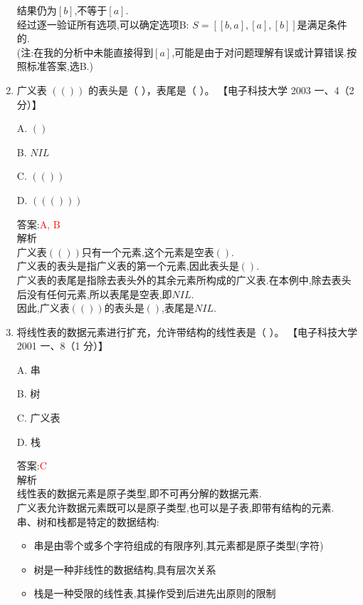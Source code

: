 \documentclass[lang=cn,newtx,10pt,scheme=chinese]{../elegantbook}
\begin{document}
\begin{enumerate}
    结果仍为$[b]$,不等于$[a]$.\\
    
    经过逐一验证所有选项,可以确定选项B: $S = [[b, a], [a], [b]]$是满足条件的.\\
    (注:在我的分析中未能直接得到$[a]$,可能是由于对问题理解有误或计算错误.按照标准答案,选B.)\\

    \item 广义表 $(( ))$ 的表头是（ ），表尾是（ ）。  
    【电子科技大学 2003 一、4（2 分）】  

    A. $()$  

    B. $NIL$

    C. $(())$ 

    D. $((()))$  
    
    答案:\textcolor{red}{A, B}\\
    解析\\
    广义表$(())$只有一个元素,这个元素是空表$()$.\\
    
    广义表的表头是指广义表的第一个元素,因此表头是$()$.\\
    
    广义表的表尾是指除去表头外的其余元素所构成的广义表.在本例中,除去表头后没有任何元素,所以表尾是空表,即$NIL$.\\
    
    因此,广义表$(())$的表头是$()$,表尾是$NIL$.\\

    \item 将线性表的数据元素进行扩充，允许带结构的线性表是（ ）。  
    【电子科技大学 2001 一、8（1 分）】  

    A. 串  

    B. 树  

    C. 广义表  

    D. 栈  
    
    答案:\textcolor{red}{C}\\
    解析\\
    线性表的数据元素是原子类型,即不可再分解的数据元素.\\
    广义表允许数据元素既可以是原子类型,也可以是子表,即带有结构的元素.\\
    
    串、树和栈都是特定的数据结构:
    \begin{itemize}
        \item 串是由零个或多个字符组成的有限序列,其元素都是原子类型(字符)
        \item 树是一种非线性的数据结构,具有层次关系
        \item 栈是一种受限的线性表,其操作受到后进先出原则的限制
    \end{itemize}
    

\end{enumerate}
\end{document}

